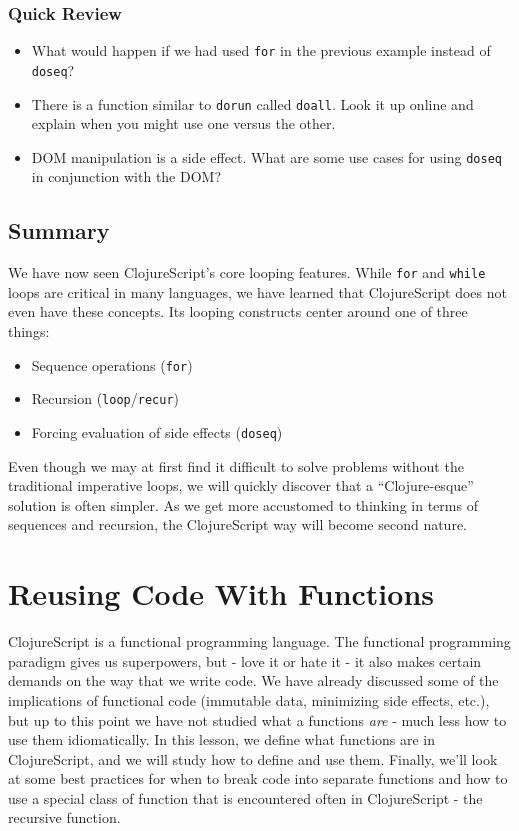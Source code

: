 \documentclass[10pt,twoside,openright]{memoir}
\begin{document}
\subsection{Quick Review}

\begin{itemize}
\tightlist
\item
  What would happen if we had used \texttt{for} in the previous example
  instead of \texttt{doseq}?
\item
  There is a function similar to \texttt{dorun} called \texttt{doall}.
  Look it up online and explain when you might use one versus the other.
\item
  DOM manipulation is a side effect. What are some use cases for using
  \texttt{doseq} in conjunction with the DOM?
\end{itemize}


\section{Summary}

We have now seen ClojureScript's core looping features. While
\texttt{for} and \texttt{while} loops are critical in many languages, we
have learned that ClojureScript does not even have these concepts. Its
looping constructs center around one of three things:

\begin{itemize}
\tightlist
\item
  Sequence operations (\texttt{for})
\item
  Recursion (\texttt{loop}/\texttt{recur})
\item
  Forcing evaluation of side effects (\texttt{doseq})
\end{itemize}

Even though we may at first find it difficult to solve problems without
the traditional imperative loops, we will quickly discover that a
``Clojure-esque'' solution is often simpler. As we get more accustomed
to thinking in terms of sequences and recursion, the ClojureScript way
will become second nature.

\chapter{Reusing Code With Functions}

ClojureScript is a functional programming language. The functional
programming paradigm gives us superpowers, but - love it or hate it - it
also makes certain demands on the way that we write code. We have
already discussed some of the implications of functional code (immutable
data, minimizing side effects, etc.), but up to this point we have not
studied what a functions \emph{are} - much less how to use them
idiomatically. In this lesson, we define what functions are in
ClojureScript, and we will study how to define and use them. Finally,
we'll look at some best practices for when to break code into separate
functions and how to use a special class of function that is encountered
often in ClojureScript - the recursive function.
\end{document}
